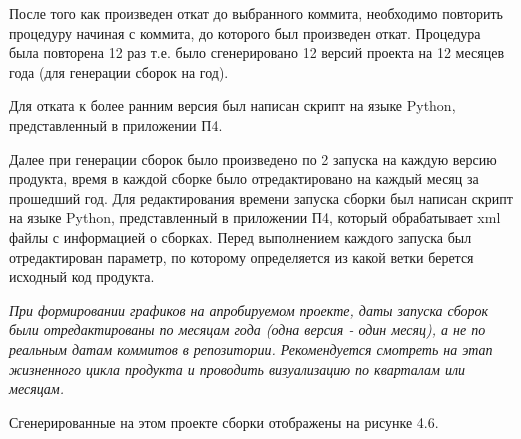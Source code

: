После того как произведен откат до выбранного коммита, необходимо повторить процедуру начиная с коммита, до которого был произведен откат. Процедура была повторена 12 раз т.е. было сгенерировано 12 версий проекта на 12 месяцев года (для генерации сборок на год).

Для отката к более ранним версия был написан скрипт на языке Python, представленный в приложении П4.

Далее при генерации сборок было произведено по 2 запуска на каждую версию продукта, время в каждой сборке было отредактировано на каждый месяц за прошедший год. Для редактирования времени запуска сборки был написан скрипт на языке Python, представленный в приложении П4, который обрабатывает xml файлы с информацией о сборках. Перед выполнением каждого запуска был отредактирован параметр, по которому определяется из какой ветки берется исходный код продукта.

\textit{При формировании графиков на апробируемом проекте, даты запуска сборок были отредактированы по месяцам года (одна версия - один месяц), а не по реальным датам коммитов в репозитории. Рекомендуется смотреть на этап жизненного цикла продукта и проводить визуализацию по кварталам или месяцам.}





Сгенерированные на этом проекте сборки отображены на рисунке 4.6.

